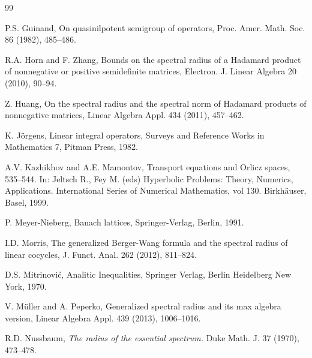 \documentclass[12pt, reqno]{amsart}
\theoremstyle{definition}
\theoremstyle{remark}
\numberwithin{equation}{section}
\begin{document}
\begin{thebibliography}{99}



 P.S. Guinand, On quasinilpotent semigroup of operators,  Proc. Amer. Math. Soc. 86 (1982), 485--486.

 R.A. Horn and F. Zhang, Bounds on the spectral radius of a Hadamard product of nonnegative or positive semidefinite matrices,
 Electron. J. Linear Algebra 20 (2010), 90--94.

 Z. Huang, On the spectral radius and the spectral norm of Hadamard products of nonnegative matrices,
 Linear Algebra Appl. 434 (2011), 457--462.

 K. J\"{o}rgens,  Linear integral operators, Surveys and Reference Works in Mathematics 7, Pitman Press, 1982.

 A.V. Kazhikhov and  A.E. Mamontov, Transport equations and Orlicz spaces, 535--544. In: Jeltsch R., Fey M. (eds) Hyperbolic Problems: Theory, Numerics, Applications. International Series of Numerical Mathematics, vol 130. Birkh\"{a}user, Basel, 1999.


 P. Meyer-Nieberg,  Banach lattices,
    Springer-Verlag, Berlin, 1991.


 I.D. Morris, The generalized Berger-Wang formula and the spectral radius of linear cocycles, J. Funct. Anal. 262 (2012),  811--824.


 D.S. Mitrinovi\'{c}, Analitic Inequalities, Springer Verlag, Berlin Heidelberg New York, 1970.

 V. M\"uller and A. Peperko, Generalized spectral radius and its max algebra version,
 Linear Algebra Appl. 439  (2013), 1006--1016.

R.D. Nussbaum,  \emph{The radius of the essential spectrum.} Duke Math. J. 37 (1970), 473--478.



\end{thebibliography}
\end{document}
